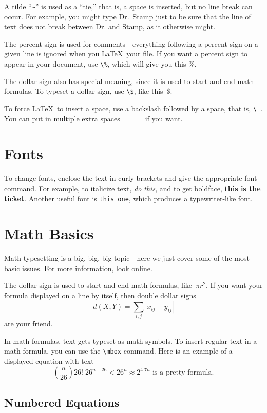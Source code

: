 A tilde ``\verb+~+'' is used as a ``tie,'' that is, a space is inserted, but no line break can occur.
For example, you might type Dr.~Stamp just to be sure that the line of text
does not break between Dr. and Stamp, as it otherwise might.

The percent sign is used for comments---everything following a percent sign 
on a given line is ignored when you \LaTeX\ your file. %
If you want a percent sign to appear in your document, use \verb+\%+, 
which will give you this \%.

The dollar sign also has special meaning, since it is used to start and end
math formulas. To typeset a dollar sign, use \verb+\$+, like this~\$.

To force \LaTeX\ to insert a space, use a backslash followed by
a space, that is, \verb+\ +. You can put in multiple extra spaces\ \ \ \ \ \ \ if you want.

\section{Fonts}

To change fonts, enclose the text in curly brackets and give the appropriate font command.
For example, to italicize text, {\it do this}, and to get boldface, {\bf this is the ticket}.
Another useful font is {\tt this one}, which produces a typewriter-like font.


\section{Math Basics}

Math typesetting is a big, big, big topic---here we just cover some of
the most basic issues. For more information, look online.

The dollar sign is used to start and end math formulas, like~$\pi r^2$.
If you want your formula displayed on a line by itself, then double
dollar signs
$$
  d(X,Y) =  \sum_{i,j} |x_{ij} - y_{ij}| 
$$
are your friend.

In math formulas, text gets typeset as math symbols. To
insert regular text in a math formula, you can use the \verb+\mbox+
command. Here is an example of a displayed equation with text
$$
  {n\choose 26} 26!\;  26^{n-26} < 26^n \approx 2^{4.7n} \mbox{ is a pretty formula} .
$$ 


\subsection{Numbered Equations}

